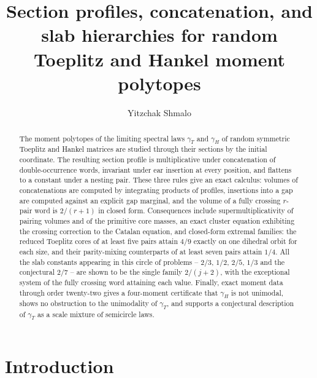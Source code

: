 \documentclass[11pt,reqno]{amsart}
\theoremstyle{plain}
\theoremstyle{remark}
\begin{document}
\title[Section profiles for Toeplitz and Hankel moment polytopes]
{Section profiles, concatenation, and slab hierarchies for random
Toeplitz and Hankel moment polytopes}

\author{Yitzchak Shmalo}
\address{Einstein Institute of Mathematics, The Hebrew University of
Jerusalem, Givat Ram, Jerusalem, Israel}


\begin{abstract}
The moment polytopes of the limiting spectral laws $\gamma_T$ and
$\gamma_H$ of random symmetric Toeplitz and Hankel matrices are
studied through their sections by the initial coordinate.  The
resulting section profile is multiplicative under concatenation of
double-occurrence words, invariant under ear insertion at every
position, and flattens to a constant under a nesting pair.  These three
rules give an exact calculus: volumes of concatenations are computed by
integrating products of profiles, insertions into a gap are computed
against an explicit gap marginal, and the volume of a fully crossing
$r$-pair word is $2/(r+1)$ in closed form.  Consequences include
supermultiplicativity of pairing volumes and of the primitive core
masses, an exact cluster equation exhibiting the crossing correction to
the Catalan equation, and closed-form extremal families: the reduced
Toeplitz cores of at least five pairs attain $4/9$ exactly on one
dihedral orbit for each size, and their parity-mixing counterparts of at
least seven pairs attain $1/4$.  All the slab constants appearing in
this circle of problems -- $2/3$, $1/2$, $2/5$, $1/3$ and the
conjectural $2/7$ -- are shown to be the single family $2/(j+2)$, with
the exceptional system of the fully crossing word attaining each value.
Finally, exact moment data through order twenty-two gives a four-moment
certificate that $\gamma_H$ is not unimodal, shows no obstruction to the
unimodality of $\gamma_T$, and supports a conjectural description of
$\gamma_T$ as a scale mixture of semicircle laws.
\end{abstract}

\maketitle

\section{Introduction}
\end{document}
